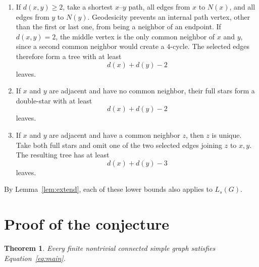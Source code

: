 \documentclass[11pt]{article}
\newtheorem{theorem}{Theorem}
\newcommand{\Ls}{L_s}
\begin{document}
\begin{enumerate}[label=\textbf{(\roman*)}, leftmargin=2.8em]
\item If $d(x,y)\ge2$, take a shortest $x$--$y$ path, all edges from
$x$ to $N(x)$, and all edges from $y$ to $N(y)$.  Geodesicity prevents
an internal path vertex, other than the first or last one, from being a
neighbor of an endpoint.  If $d(x,y)=2$, the middle vertex is the only
common neighbor of $x$ and $y$, since a second common neighbor would
create a $4$-cycle.  The selected edges therefore form a tree with at
least
\begin{equation}\label{eq:far}
  d(x)+d(y)-2
\end{equation}
leaves.

\item If $x$ and $y$ are adjacent and have no common neighbor, their
full stars form a double-star with at least
\begin{equation}\label{eq:adj0}
  d(x)+d(y)-2
\end{equation}
leaves.

\item If $x$ and $y$ are adjacent and have a common neighbor $z$, then
$z$ is unique.  Take both full stars and omit one of the two selected
edges joining $z$ to $x,y$.  The resulting tree has at least
\begin{equation}\label{eq:adj1}
  d(x)+d(y)-3
\end{equation}
leaves.
\end{enumerate}

By Lemma~\ref{lem:extend}, each of these lower bounds also applies to
$\Ls(G)$.

\section{Proof of the conjecture}

\begin{theorem}
Every finite nontrivial connected simple graph satisfies
Equation~\eqref{eq:main}.
\end{theorem}
\end{document}
